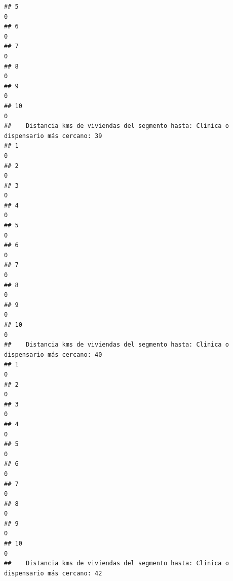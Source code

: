 \documentclass[11pt,]{article}
\begin{document}
\begin{verbatim}
## 5                                                                                     0
## 6                                                                                     0
## 7                                                                                     0
## 8                                                                                     0
## 9                                                                                     0
## 10                                                                                    0
##    Distancia kms de viviendas del segmento hasta: Clinica o dispensario más cercano: 39
## 1                                                                                     0
## 2                                                                                     0
## 3                                                                                     0
## 4                                                                                     0
## 5                                                                                     0
## 6                                                                                     0
## 7                                                                                     0
## 8                                                                                     0
## 9                                                                                     0
## 10                                                                                    0
##    Distancia kms de viviendas del segmento hasta: Clinica o dispensario más cercano: 40
## 1                                                                                     0
## 2                                                                                     0
## 3                                                                                     0
## 4                                                                                     0
## 5                                                                                     0
## 6                                                                                     0
## 7                                                                                     0
## 8                                                                                     0
## 9                                                                                     0
## 10                                                                                    0
##    Distancia kms de viviendas del segmento hasta: Clinica o dispensario más cercano: 42

\end{verbatim}
\end{document}
